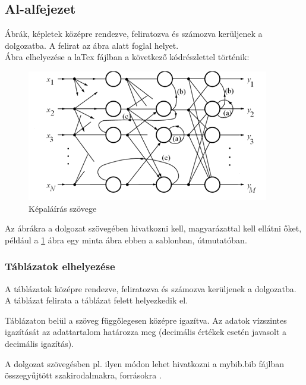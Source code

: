 \subsection{Al-alfejezet}
Ábrák, képletek középre rendezve, feliratozva és számozva kerüljenek a dolgozatba. A felirat az ábra alatt foglal helyet.\\
Ábra elhelyezése a laTex fájlban a következő kódrészlettel történik:\\
\begin{figure}[H]
    \centering %
    \includegraphics{img/minta1.png} %
    \caption{Képaláírás szövege \cite{detection16}} %
    \label{fig:fig_minta1} %
\end{figure}
Az ábrákra a dolgozat szövegében hivatkozni kell, magyarázattal kell ellátni őket, például a \ref{fig:fig_minta1} ábra egy minta ábra ebben a sablonban, útmutatóban.

\subsubsection{Táblázatok elhelyezése}
A táblázatok középre rendezve, feliratozva és számozva kerüljenek a dolgozatba. A táblázat felirata a táblázat felett helyezkedik el.\par
Táblázaton belül a szöveg függőlegesen középre igazítva. Az adatok vízszintes igazítását az adattartalom határozza meg (decimális értékek esetén javasolt a decimális igazítás).\par
A dolgozat szövegésben pl. ilyen módon lehet hivatkozni a mybib.bib fájlban összegyűjtött szakirodalmakra, forrásokra \cite{detection01, detection02}.


